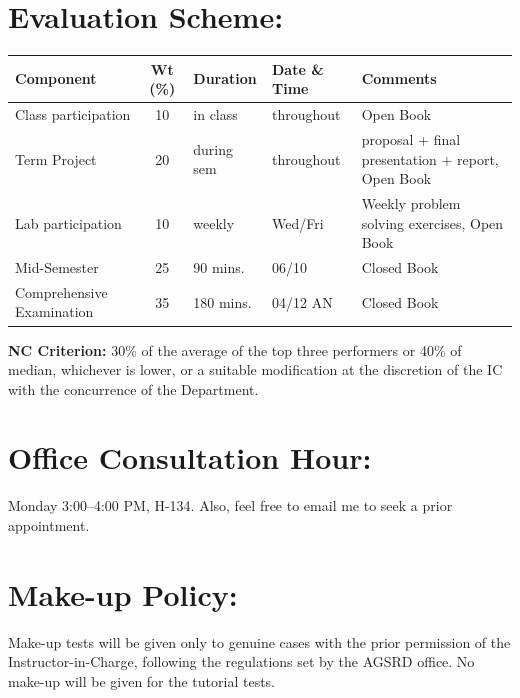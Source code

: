 \documentclass[11pt,letterpaper]{article}
\begin{document}
\begin{sf}
\section{Evaluation Scheme:}

\begin{center}
\renewcommand{\arraystretch}{1.5}
\begin{tabular}{|l|c|m{2cm}|m{2.5cm}|m{4cm}|}
\hline
\textbf{Component}  & \textbf{Wt (\%)}& \textbf{Duration} &  \textbf{Date \& Time} & \textbf{Comments} \\
\hline
Class participation & 10 & in class & throughout & Open Book \\
\hline
Term Project        & 20 & during sem & throughout & proposal + final presentation + report, Open Book \\
\hline
Lab participation & 10 & weekly & Wed/Fri & Weekly problem solving exercises, Open Book \\
\hline
Mid-Semester   & 25 & 90 mins. & 06/10 & Closed Book \\
\hline
Comprehensive Examination & 35 & 180 mins. & 04/12 AN & Closed Book \\
\hline
\end{tabular}
\end{center}

\noindent
\textbf{NC Criterion:} 30\% of the average of the top three performers or 40\% of median, whichever is lower, or a suitable modification at the discretion of the IC with the concurrence of the Department.
\\

\section{Office Consultation Hour:}
Monday 3:00--4:00 PM, H-134. Also, feel free to email me to seek a prior appointment.

\section{Make-up Policy:}
Make-up tests will be given only to genuine cases with the prior permission of the Instructor-in-Charge, following the regulations set by the AGSRD office. No make-up will be given for the tutorial tests.


\end{sf}
\end{document}
